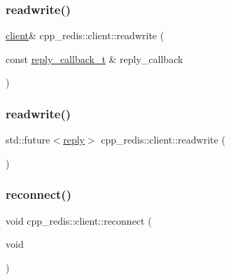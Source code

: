 \mbox{\label{classcpp__redis_1_1client_a0a9bfe5e6ec4ccbaf2b633dedc55a581}} 
\subsubsection{\texorpdfstring{readwrite()}{readwrite()}\hspace{0.1cm}{\footnotesize\ttfamily [1/2]}}
{\footnotesize\ttfamily \hyperlink{classcpp__redis_1_1client}{client}\& cpp\+\_\+redis\+::client\+::readwrite (\begin{DoxyParamCaption}\item[{const \hyperlink{classcpp__redis_1_1client_a061a1140d36d2eaeda82b09a0bb3f9f2}{reply\+\_\+callback\+\_\+t} \&}]{reply\+\_\+callback }\end{DoxyParamCaption})}

\mbox{\label{classcpp__redis_1_1client_afc139fc098703cf5ec661fedc0552184}} 
\subsubsection{\texorpdfstring{readwrite()}{readwrite()}\hspace{0.1cm}{\footnotesize\ttfamily [2/2]}}
{\footnotesize\ttfamily std\+::future$<$\hyperlink{classcpp__redis_1_1reply}{reply}$>$ cpp\+\_\+redis\+::client\+::readwrite (\begin{DoxyParamCaption}{ }\end{DoxyParamCaption})}

\mbox{\label{classcpp__redis_1_1client_aa27639ab1fea971f50664cbb20918b34}} 
\subsubsection{\texorpdfstring{reconnect()}{reconnect()}}
{\footnotesize\ttfamily void cpp\+\_\+redis\+::client\+::reconnect (\begin{DoxyParamCaption}\item[{void}]{ }\end{DoxyParamCaption})\hspace{0.3cm}{\ttfamily [private]}}

